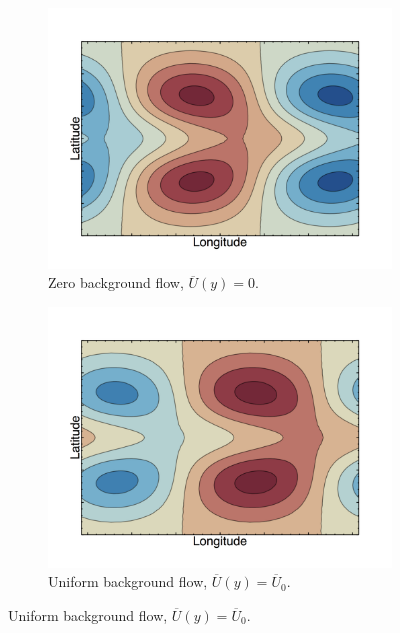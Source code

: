 \begin{figure}
  \centering
  \begin{subfigure}[t]{0.48\textwidth}
    \includegraphics[width=\textwidth]{figures/wave-mean-flow/expl-non-shifted-matsuno.png}
    \caption{Zero background flow, $\overline{U}(y) = 0$. }
    \label{fig:expl-non-shifted-matsuno}
  \end{subfigure}
  \begin{subfigure}[t]{0.48\textwidth}
    \includegraphics[width=\textwidth]{figures/wave-mean-flow/expl-shifted-matsuno.png}
    \caption{Uniform background flow, $\overline{U}(y) = \overline{U}_{0}$.}
    \label{fig:expl-shifted-matsuno}
  \end{subfigure}

\end{figure}
